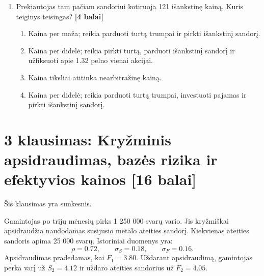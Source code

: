 \documentclass[11pt]{article}
\newcommand{\pts}[1]{\hspace{0.35em}\textnormal{\textbf{[#1 balai]}}}
\newenvironment{choices}{\begin{enumerate}[label=\Alph*.,leftmargin=2.2em,itemsep=0.12em,topsep=0.12em]}{\end{enumerate}}
\begin{document}
\begin{enumerate}
    \item Prekiautojas tam pačiam sandoriui kotiruoja 121 išankstinę kainą.
    Kuris teiginys teisingas? \pts{4}
    \begin{choices}
        \item Kaina per maža; reikia parduoti turtą trumpai ir pirkti išankstinį sandorį.
        \item Kaina per didelė; reikia pirkti turtą, parduoti išankstinį sandorį
        ir užfiksuoti apie 1.32 pelno vienai akcijai.
        \item Kaina tiksliai atitinka nearbitražinę kainą.
        \item Kaina per didelė; reikia parduoti turtą trumpai, investuoti pajamas
        ir pirkti išankstinį sandorį.
    \end{choices}
\end{enumerate}

\section*{3 klausimas: Kryžminis apsidraudimas, bazės rizika ir efektyvios kainos \pts{16}}

Šis klausimas yra sunkesnis.

Gamintojas po trijų mėnesių pirks 1 250 000 svarų vario. Jis kryžmiškai
apsidraudžia naudodamas susijusio metalo ateities sandorį. Kiekvienas ateities
sandoris apima 25 000 svarų. Istoriniai duomenys yra:
\[
    \rho=0.72,\qquad \sigma_S=0.18,\qquad \sigma_F=0.16.
\]
Apsidraudimas pradedamas, kai $F_1=3.80$. Uždarant apsidraudimą, gamintojas
perka varį už $S_2=4.12$ ir uždaro ateities sandorius už $F_2=4.05$.
\end{document}
